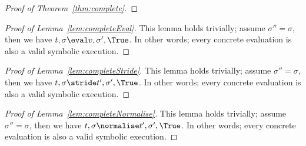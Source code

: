 





\begin{proof}[Proof of Theorem~\ref{thm:complete}]
\end{proof}



\begin{proof}[Proof of Lemma~\ref{lem:completeEval}]
This lemma holds trivially; assume $\sigma''=\sigma$, then we have $t,\sigma\eval v,\sigma',\True$.
In other words; every concrete evaluation is also a valid symbolic execution.
\end{proof}



\begin{proof}[Proof of Lemma~\ref{lem:completeStride}]
This lemma holds trivially; assume $\sigma''=\sigma$, then we have $t,\sigma\stride t',\sigma',\True$.
In other words; every concrete evaluation is also a valid symbolic execution.
\end{proof}



\begin{proof}[Proof of Lemma~\ref{lem:completeNormalise}]
This lemma holds trivially; assume $\sigma''=\sigma$, then we have $t,\sigma\normalise t',\sigma',\True$.
In other words; every concrete evaluation is also a valid symbolic execution.
\end{proof}



